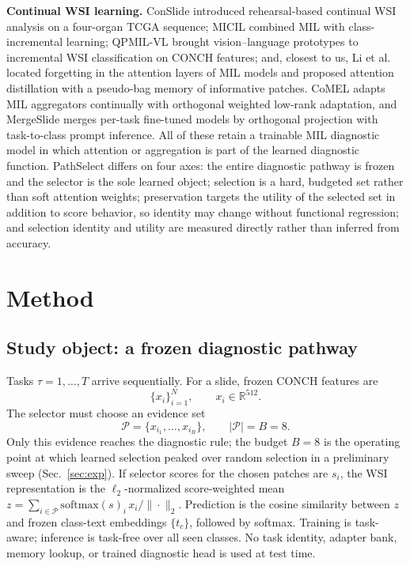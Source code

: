 \documentclass{article}
\newcommand{\Psel}{\mathcal{P}}
\begin{document}
\textbf{Continual WSI learning.} ConSlide \cite{huang2023conslide} introduced rehearsal-based continual WSI analysis on a four-organ TCGA sequence; MICIL \cite{meseguer2024micil} combined MIL with class-incremental learning; QPMIL-VL \cite{gou2025qpmil} brought vision--language prototypes to incremental WSI classification on CONCH features; and, closest to us, Li et al.\ \cite{li2025akd} located forgetting in the attention layers of MIL models and proposed attention distillation with a pseudo-bag memory of informative patches. CoMEL \cite{lee2025comel} adapts MIL aggregators continually with orthogonal weighted low-rank adaptation, and MergeSlide \cite{bui2026mergeslide} merges per-task fine-tuned models by orthogonal projection with task-to-class prompt inference. All of these retain a trainable MIL diagnostic model in which attention or aggregation is part of the learned diagnostic function. PathSelect differs on four axes: the entire diagnostic pathway is frozen and the selector is the sole learned object; selection is a hard, budgeted set rather than soft attention weights; preservation targets the utility of the selected set in addition to score behavior, so identity may change without functional regression; and selection identity and utility are measured directly rather than inferred from accuracy.

\section{Method}
\label{sec:method}

\subsection{Study object: a frozen diagnostic pathway}
\label{ssec:setup}

Tasks $\tau=1,\ldots,T$ arrive sequentially.
For a slide, frozen CONCH features are
\[
\{x_i\}_{i=1}^{N}, \qquad x_i\in\mathbb{R}^{512}.
\]
The selector must choose an evidence set
\[
\Psel=\{x_{i_1},\ldots,x_{i_B}\}, \qquad |\Psel|=B=8.
\]
Only this evidence reaches the diagnostic rule; the budget $B{=}8$ is the operating point at which learned selection peaked over random selection in a preliminary sweep (Sec.~\ref{sec:exp}).
If selector scores for the chosen patches are $s_i$, the WSI representation is the $\ell_2$-normalized score-weighted mean $z=\sum_{i\in\Psel}\mathrm{softmax}(s)_i\,x_i/\|\cdot\|_2$.
Prediction is the cosine similarity between $z$ and frozen class-text embeddings $\{t_c\}$, followed by softmax.
Training is task-aware; inference is task-free over all seen classes.
No task identity, adapter bank, memory lookup, or trained diagnostic head is used at test time.
\end{document}
